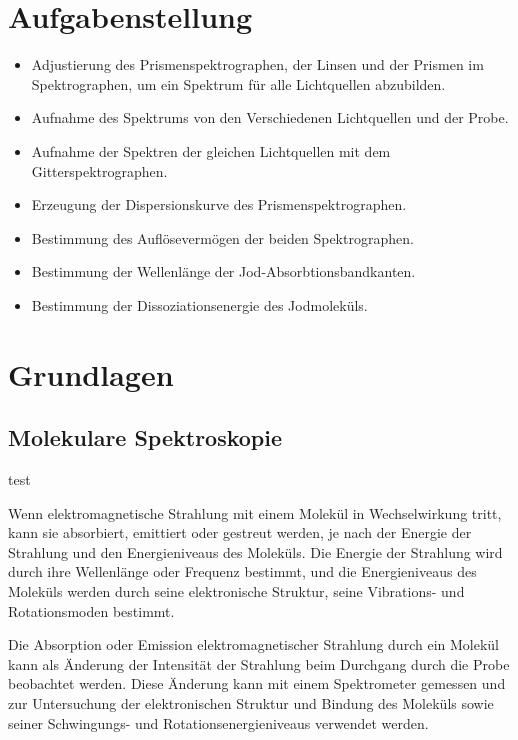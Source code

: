 \documentclass[12pt,english,ngerman]{scrartcl}
\begin{document}
%
\section{Aufgabenstellung\label{sec:Aufgabenstellung}}

\begin{itemize}
	\item Adjustierung des Prismenspektrographen, der Linsen und der Prismen im
	      Spektrographen, um ein Spektrum für alle Lichtquellen abzubilden.
	\item Aufnahme des Spektrums von den Verschiedenen Lichtquellen und der Probe.
	\item Aufnahme der Spektren der gleichen Lichtquellen mit dem Gitterspektrographen.
	\item Erzeugung der Dispersionskurve des Prismenspektrographen.
	\item Bestimmung des Auflösevermögen der beiden Spektrographen.
	\item Bestimmung der Wellenlänge der Jod-Absorbtionsbandkanten.
	\item Bestimmung der Dissoziationsenergie des Jodmoleküls.
\end{itemize}

\section{Grundlagen}\label{sec:Grund}

\subsection{Molekulare Spektroskopie}

test

Wenn elektromagnetische Strahlung mit einem Molekül in Wechselwirkung tritt,
kann sie absorbiert, emittiert oder gestreut werden, je nach der Energie der
Strahlung und den Energieniveaus des Moleküls. Die Energie der Strahlung wird
durch ihre Wellenlänge oder Frequenz bestimmt, und die Energieniveaus des
Moleküls werden durch seine elektronische Struktur, seine Vibrations- und
Rotationsmoden bestimmt.

Die Absorption oder Emission elektromagnetischer Strahlung durch ein Molekül
kann als Änderung der Intensität der Strahlung beim Durchgang durch die Probe
beobachtet werden. Diese Änderung kann mit einem Spektrometer gemessen und zur
Untersuchung der elektronischen Struktur und Bindung des Moleküls sowie seiner
Schwingungs- und Rotationsenergieniveaus verwendet werden.
\end{document}
